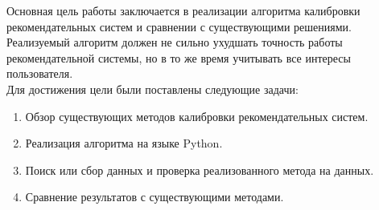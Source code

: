 

Основная цель работы заключается в реализации алгоритма 
калибровки рекомендательных систем и сравнении с существующими решениями.
Реализуемый алгоритм должен не сильно ухудшать
точность работы рекомендательной системы, но в то же время 
учитывать все интересы пользователя.
\\

Для достижения цели были поставлены следующие задачи:
\begin{enumerate} 
    \item Обзор существующих методов калибровки рекомендательных систем.
    \item Реализация алгоритма на языке Python.
    \item Поиск или сбор данных и проверка реализованного метода на данных.
    \item Сравнение результатов с существующими методами.
  \end{enumerate}
  